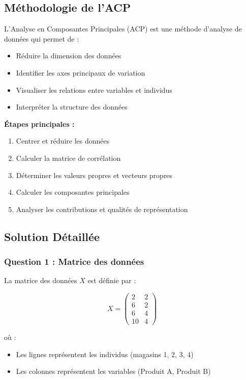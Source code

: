 \documentclass[11pt,a4paper]{article}
\begin{document}
\subsection{Méthodologie de l'ACP}

\begin{definitionbox}
L'Analyse en Composantes Principales (ACP) est une méthode d'analyse de données qui permet de :
\begin{itemize}
    \item Réduire la dimension des données
    \item Identifier les axes principaux de variation
    \item Visualiser les relations entre variables et individus
    \item Interpréter la structure des données
\end{itemize}

\textbf{Étapes principales :}
\begin{enumerate}
    \item Centrer et réduire les données
    \item Calculer la matrice de corrélation
    \item Déterminer les valeurs propres et vecteurs propres
    \item Calculer les composantes principales
    \item Analyser les contributions et qualités de représentation
\end{enumerate}
\end{definitionbox}

\subsection{Solution Détaillée}

\subsubsection{Question 1 : Matrice des données}

La matrice des données $X$ est définie par :

$$X = \begin{pmatrix}
2 & 2 \\
6 & 2 \\
6 & 4 \\
10 & 4
\end{pmatrix}$$

où :
\begin{itemize}
    \item Les lignes représentent les individus (magasins 1, 2, 3, 4)
    \item Les colonnes représentent les variables (Produit A, Produit B)
\end{itemize}
\end{document}
